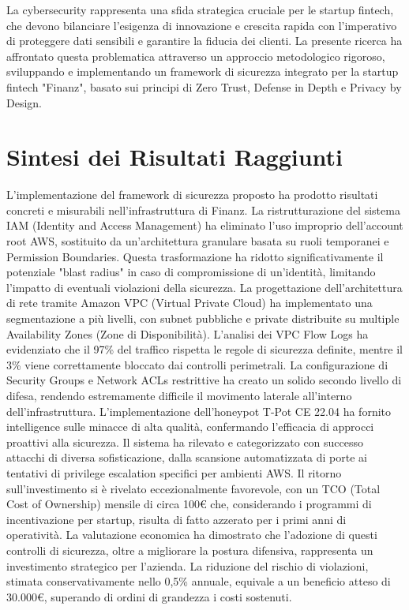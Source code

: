 La cybersecurity rappresenta una sfida strategica cruciale per le startup fintech, che devono bilanciare l'esigenza di innovazione e crescita rapida con l'imperativo di proteggere dati sensibili e garantire la fiducia dei clienti. La presente ricerca ha affrontato questa problematica attraverso un approccio metodologico rigoroso, sviluppando e implementando un framework di sicurezza integrato per la startup fintech "Finanz", basato sui principi di Zero Trust, Defense in Depth e Privacy by Design.
\section{Sintesi dei Risultati Raggiunti}
L'implementazione del framework di sicurezza proposto ha prodotto risultati concreti e misurabili nell'infrastruttura di Finanz. La ristrutturazione del sistema IAM (Identity and Access Management) ha eliminato l'uso improprio dell'account root AWS, sostituito da un'architettura granulare basata su ruoli temporanei e Permission Boundaries. Questa trasformazione ha ridotto significativamente il potenziale "blast radius" in caso di compromissione di un'identità, limitando l'impatto di eventuali violazioni della sicurezza.
La progettazione dell'architettura di rete tramite Amazon VPC (Virtual Private Cloud) ha implementato una segmentazione a più livelli, con subnet pubbliche e private distribuite su multiple Availability Zones (Zone di Disponibilità). L'analisi dei VPC Flow Logs ha evidenziato che il 97\% del traffico rispetta le regole di sicurezza definite, mentre il 3\% viene correttamente bloccato dai controlli perimetrali. La configurazione di Security Groups e Network ACLs restrittive ha creato un solido secondo livello di difesa, rendendo estremamente difficile il movimento laterale all'interno dell'infrastruttura.
L'implementazione dell'honeypot T-Pot CE 22.04 ha fornito intelligence sulle minacce di alta qualità, confermando l'efficacia di approcci proattivi alla sicurezza. Il sistema ha rilevato e categorizzato con successo attacchi di diversa sofisticazione, dalla scansione automatizzata di porte ai tentativi di privilege escalation specifici per ambienti AWS. Il ritorno sull'investimento si è rivelato eccezionalmente favorevole, con un TCO (Total Cost of Ownership) mensile di circa 100€ che, considerando i programmi di incentivazione per startup, risulta di fatto azzerato per i primi anni di operatività.
La valutazione economica ha dimostrato che l'adozione di questi controlli di sicurezza, oltre a migliorare la postura difensiva, rappresenta un investimento strategico per l'azienda. La riduzione del rischio di violazioni, stimata conservativamente nello 0,5\% annuale, equivale a un beneficio atteso di 30.000€, superando di ordini di grandezza i costi sostenuti.
